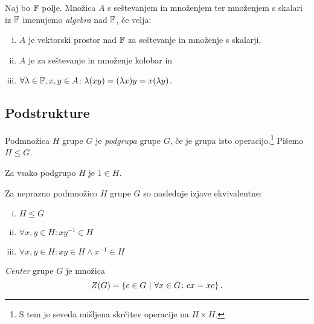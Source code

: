 \begin{definicija}
Naj bo $\mathbb{F}$ polje. Množica $A$ s seštevanjem in množenjem ter množenjem s skalari iz $\mathbb{F}$ imenujemo \emph{algebra} nad $\mathbb{F}$, če velja:

\begin{enumerate}[i)]
\item $A$ je vektorski prostor nad $\mathbb{F}$ za seštevanje in množenje s skalarji,
\item $A$ je za seštevanje in množenje kolobar in
\item $\forall \lambda \in \mathbb{F}, x,y \in A \colon \lambda(xy) = (\lambda x)y = x(\lambda y)$.
\end{enumerate}
\end{definicija}

\newpage

\subsection{Podstrukture}


\begin{definicija}
Podmnožica $H$ grupe $G$ je \emph{podgrupa} grupe $G$, če je grupa isto operacijo.\footnote{S tem je seveda mišljena skrčitev operacije na $H \times H$.} Pišemo $H \leq G$.
\end{definicija}

\begin{opomba}
Za vsako podgrupo $H$ je $1 \in H$.
\end{opomba}

\begin{trditev}
Za neprazno podmnožico $H$ grupe $G$ so naslednje izjave ekvivalentne:

\begin{enumerate}[i)]
\item $H \leq G$
\item $\forall x, y \in H \colon xy^{-1} \in H$
\item $\forall x, y \in H \colon xy \in H \land x^{-1} \in H$
\end{enumerate}
\end{trditev}

\obvs

\begin{definicija}
\emph{Center} grupe $G$ je množica
\[
Z(G) = \left\{c \in G~\middle\vert~\forall x \in G \colon cx = xc\right\}.
\]
\end{definicija}


